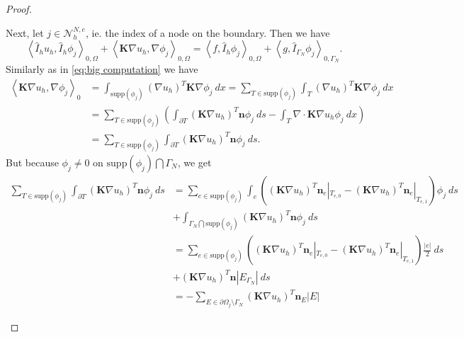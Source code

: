\documentclass[../Main/main.tex]{subfiles}
\begin{document}
\begin{proof}
\begin{enumerate}
\begin{equation}
			\end{equation}
			Next, let $j \in \mathcal{N}_h^{N,e}$, ie. the index of a node on the boundary. Then we have 
			\begin{equation}\label{eq:case neumann node}
				\left \langle \hat{I}_h u_h,\hat{I}_h \phi_j \right \rangle_{0,\Omega} +   \left \langle\bm{K} \nabla u_h,\nabla \phi_j \right \rangle_{0,\Omega} = \left \langle f,\hat{I}_h \phi_j \right \rangle_{0,\Omega}+ \left \langle g,\hat{I}_{\Gamma_N} \phi_j \right \rangle_{0,\Gamma_N}.
			\end{equation}
			Similarly as in \eqref{eq:big computation} we have
			\begin{equation}\label{eq:case neumann 1}
				\begin{aligned}
						\left \langle\bm{K}\nabla u_h, \nabla \phi_{j} \right \rangle_0 &= \int_{\text{supp}(\phi_{j})} (\nabla u_h)^T\bm{K}\nabla \phi_{j} \ dx = \sum_{T\in \text{supp}(\phi_{j})} \int_T (\nabla u_h)^T\bm{K}\nabla \phi_{j} \ dx \\
					&= \sum_{T\in \text{supp}(\phi_{j})} \left ( \int_{\partial T} (\bm{K}\nabla u_h)^T\bm{n}\phi_{j} \ ds-\int_T \nabla \cdot\bm{K} \nabla u_h \phi_{j} \ dx \right ) \\
					&=\sum_{T\in \text{supp}(\phi_{j})}\int_{\partial T} (\bm{K}\nabla u_h)^T\bm{n}\phi_{j} \ ds.
				\end{aligned}
			\end{equation}
			But because $\phi_{j}\neq 0$ on $\text{supp}(\phi_{j})\bigcap \Gamma_N$, we get
			\begin{equation}\label{eq:case neumann 2}
				\begin{aligned}
					\sum_{T\in \text{supp}(\phi_{j})}\int_{\partial T} (\bm{K}\nabla u_h)^T\bm{n}\phi_{j} \ ds &= \sum_{e\in \text{supp}(\phi_{j})} \int_e \left((\bm{K}\nabla u_h)^T\bm{n}_e|_{T_{e,0}} - (\bm{K}\nabla u_h)^T\bm{n}_e|_{T_{e,1}}\right)\phi_j \ ds\\ &+ \int_{\Gamma_N \bigcap \text{supp}(\phi_{j})}(\bm{K}\nabla u_h)^T\bm{n} \phi_j \ ds\\
					&= \sum_{e\in \text{supp}(\phi_{j})} \left ((\bm{K}\nabla u_h)^T\bm{n}_e|_{T_{e,0}} - (\bm{K}\nabla u_h)^T\bm{n}_e|_{T_{e,1}}\right)\frac{|e|}{2} \ ds\\ &+ (\bm{K}\nabla u_h)^T\bm{n} |E_{\Gamma_N}| \ ds\\
					&= -\sum_{E\in \partial \Omega_{j}\setminus \Gamma_N} (\bm{K}\nabla u_h)^T\bm{n}_E |E|
				\end{aligned}
			\end{equation}

\end{enumerate}
\end{proof}
\end{document}
